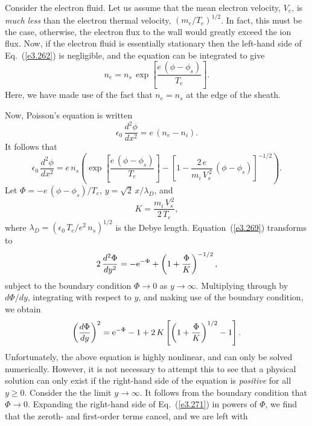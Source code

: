 Consider the electron fluid. Let us assume that the mean electron
velocity, $V_e$, is {\em much less}\/ than the electron thermal
velocity, $(m_e/T_e)^{1/2}$. In fact, this must be the case, otherwise,
the electron flux to the wall would greatly exceed the ion flux. 
Now, if the electron fluid is essentially stationary then the left-hand side of
Eq.~(\ref{e3.262}) is negligible, and the equation can be integrated to
give
\begin{equation}\label{e3.267}
n_e = n_s\,\exp\left[\frac{e\,(\phi-\phi_s)}{T_e}\right].
\end{equation}
Here, we have made use of the  fact  that $n_e=n_s$ at
the edge of the sheath. 

Now, Poisson's equation is written
\begin{equation}
\epsilon_0\,\frac{d^2\phi}{dx^2} = e\,(n_e-n_i).
\end{equation}
It follows that
\begin{equation}\label{e3.269}
\epsilon_0\,\frac{d^2\phi}{dx^2}= e\,n_s\left(\exp\left[\frac{e\,(\phi-\phi_s)}{T_e}\right]-\left[1- \frac{2\,e}{m_i\,V_s^{\,2}}\,(\phi-\phi_s)\right]^{-1/2}\right).
\end{equation}
Let $\Phi=-e\,(\phi-\phi_s)/T_e$, $y = \sqrt{2}\,x/\lambda_D$, and
\begin{equation}
K =\frac{m_i\,V_s^{\,2}}{2\,T_e},
\end{equation}
 where $\lambda_D= (\epsilon_0\,T_e/e^2\,n_s)^{1/2}$ is the Debye length. Equation~(\ref{e3.269}) transforms to
\begin{equation}
2\,\frac{d^2 \Phi}{dy^2} = - {\rm e}^{-\Phi}+ \left(1+\frac{\Phi}{K}\right)^{-1/2},
\end{equation}
subject to the boundary condition  $\Phi\rightarrow 0$ as $y\rightarrow \infty$. 
Multiplying through by $d\Phi/dy$, integrating with respect to $y$, and making use of the
boundary condition, we obtain
\begin{equation}\label{e3.271}
\left(\frac{d\Phi}{dy}\right)^2 = {\rm e}^{-\Phi}-1+ 2\,K\left[
\left(1+\frac{\Phi}{K}\right)^{1/2}-1\right].
\end{equation}
Unfortunately, the above equation is highly nonlinear, and can only be solved numerically. 
However, it is not necessary to attempt this to see that 
 a physical solution can only exist
if the right-hand side of the equation is {\em positive}\/ for all  $y\geq 0$. Consider the  the
limit  $y\rightarrow\infty$. It follows from the boundary condition that $\Phi\rightarrow 0$. Expanding
the right-hand side of Eq.~(\ref{e3.271}) in powers of $\Phi$, we find that the zeroth- and first-order terms cancel, and  we are left with
